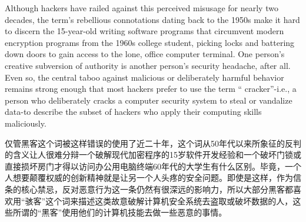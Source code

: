 \ifdefined\eng
Although hackers have railed against this perceived misusage for nearly two decades, the term's rebellious connotations dating back to the 1950s make it hard to discern the 15-year-old writing software programs that circumvent modern encryption programs from the 1960s college student, picking locks and battering down doors to gain access to the lone, office computer terminal. One person's creative subversion of authority is another person's security headache, after all. Even so, the central taboo against malicious or deliberately harmful behavior remains strong enough that most hackers prefer to use the term `` cracker''-i.e., a person who deliberately cracks a computer security system to steal or vandalize data-to describe the subset of hackers who apply their computing skills maliciously.
\fi

\ifdefined\chs
仅管黑客这个词被这样错误的使用了近二十年，这个词从50年代以来所象征的反判的含义让人很难分辩一个破解现代加密程序的15岁软件开发经验和一个破坏门锁或直接损坏房门才得以访问办公用电脑终端60年代的大学生有什么区别。毕竟，一个人想要颠覆权威的创新精神就是让另一个人头疼的安全问题。即使是这样，作为信条的核心禁忌，反对恶意行为这一条仍然有很深远的影响力，所以大部分黑客都喜欢用``骇客''这个词来描述这类故意破解计算机安全系统去盗取或破坏数据的人，这些所谓的``黑客''使用他们的计算机技能去做一些恶意的事情。
\fi




